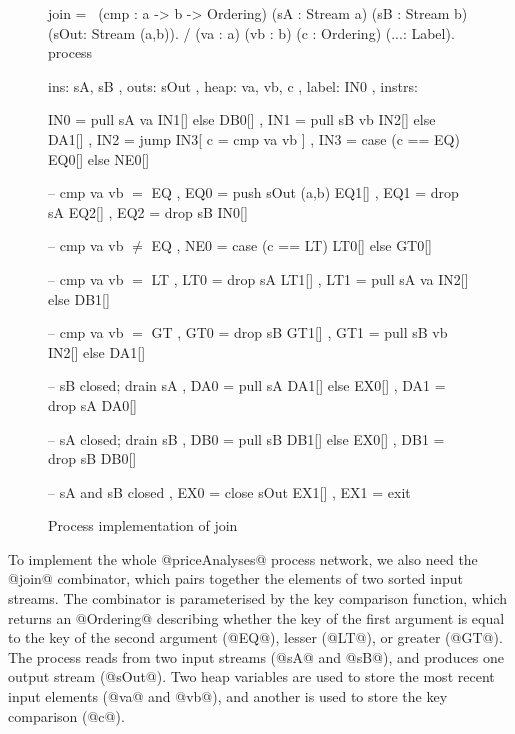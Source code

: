\begin{figure}
\begin{process}
join 
  = \ (cmp : a -> b -> Ordering)
      (sA  : Stream a) (sB : Stream b)
      (sOut: Stream (a,b)). 
    / (va : a) (vb : b) (c : Ordering) (...: Label).
    process
     { ins:    { sA, sB }
     , outs:   { sOut }
     , heap:   { va, vb, c }
     , label:  IN0
     , instrs: { IN0 = pull  sA va      IN1[] else DB0[]
               , IN1 = pull  sB vb      IN2[] else DA1[]
               , IN2 = jump             IN3[ c = cmp va vb ]
               , IN3 = case  (c == EQ)  EQ0[] else NE0[]

               -- cmp va vb $=$ EQ
               , EQ0 = push  sOut (a,b) EQ1[]
               , EQ1 = drop  sA         EQ2[]
               , EQ2 = drop  sB         IN0[]

               -- cmp va vb $\not=$ EQ
               , NE0 = case  (c == LT)  LT0[] else GT0[]

               -- cmp va vb $=$ LT
               , LT0 = drop  sA         LT1[]
               , LT1 = pull  sA va      IN2[] else DB1[]

               -- cmp va vb $=$ GT
               , GT0 = drop  sB         GT1[]
               , GT1 = pull  sB vb      IN2[] else DA1[]

               -- sB closed; drain sA
               , DA0 = pull  sA         DA1[] else EX0[]
               , DA1 = drop  sA         DA0[]

               -- sA closed; drain sB
               , DB0 = pull  sB         DB1[] else EX0[]
               , DB1 = drop  sB         DB0[]

               -- sA and sB closed
               , EX0 = close sOut       EX1[]
               , EX1 = exit } }
\end{process}
\caption{Process implementation of join}
\label{figs/procs/impl/join}
\end{figure}

To implement the whole @priceAnalyses@ process network, we also need the @join@ combinator, which pairs together the elements of two sorted input streams.
The combinator is parameterised by the key comparison function, which returns an @Ordering@ describing whether the key of the first argument is equal to the key of the second argument (@EQ@), lesser (@LT@), or greater (@GT@).
The process reads from two input streams (@sA@ and @sB@), and produces one output stream (@sOut@).
Two heap variables are used to store the most recent input elements (@va@ and @vb@), and another is used to store the key comparison (@c@).

